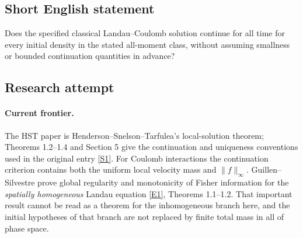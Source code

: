 \documentclass[11pt,a4paper]{article}
\newcommand{\sref}[2]{\hyperlink{source:#1:#2}{[S#2]}}
\newcommand{\eref}[2]{\hyperlink{extra:#1:#2}{[E#2]}}
\newif\ifshowcatalogue
\newcommand{\cataloguescope}[1]{\ifshowcatalogue
 \paragraph{Exact scope in the supplied catalogue.}
 \begin{quote}\small #1\end{quote}\fi}
\numberwithin{equation}{section}
\begin{document}
\cataloguescope{Fix a positive physical constant a. On [0,infinity) times R\textasciicircum{}3\_x times R\textasciicircum{}3\_v consider the classical Landau equation (partial\_t+v dot grad\_x)f=Q(f,f), where Q(f,f)=div\_v integral\_\{R\textasciicircum{}3\} A(v-w)[f(t,x,w) grad\_v f(t,x,v)-f(t,x,v) grad\_w f(t,x,w)]dw and A(z)=a |z|\textasciicircum{}(-1)(I-z tensor z/|z|\textasciicircum{}2) for z!=0. For every nonnegative initial datum f\_0 on R\textasciicircum{}6 with f\_0 in the global Holder space C\textasciicircum{}alpha for some 0<alpha<1, sup\_\{x,v\}<v>\textasciicircum{}k f\_0(x,v)<infinity for every k>=0, and constants delta,r\_0,R>0 such that for every x there exists |v\_x|<R with f\_0>=delta on the Euclidean R\textasciicircum{}6 ball B\_\{r\_0\}(x,v\_x), does the classical solution branch constructed in HST Theorems 1.2–1.4 have maximal continuation time T\_E=infinity? Here <v>=(1+|v|\textasciicircum{}2)\textasciicircum{}(1/2); the branch matches f\_0 as t decreases to zero, is smooth for positive time, and has all polynomial velocity weights bounded on every finite time slab of its existence. The exact question is global extension of that branch, with the sufficiently decaying uniformly continuous kinetic weak uniqueness convention in HST Section 5, not uniqueness among all generalized weak solutions. The HST Coulomb continuation quantity is Psi(T)=esssup\_\{0<=t<=T,x\} integral f(t,x,v)dv + esssup\_\{0<=t<=T,x,v\} f(t,x,v). Finite Psi on every finite time slab is the associated continuation criterion, not an extra hypothesis presumed true. No smallness near equilibrium, finite total spatial mass or uniform bound across different initial data is imposed.}
\subsection{Short English statement}
Does the specified classical Landau–Coulomb solution continue for all time for every initial density in the stated all-moment class, without assuming smallness or bounded continuation quantities in advance?
\subsection{Research attempt}

\paragraph{Current frontier.}
The HST paper is Henderson--Snelson--Tarfulea's local-solution theorem;
Theorems 1.2--1.4 and Section 5 give the continuation and uniqueness
conventions used in the original entry \sref{30006773}{1}. For Coulomb
interactions the continuation criterion contains both the uniform local
velocity mass and $\|f\|_\infty$. Guillen--Silvestre prove global regularity
and monotonicity of Fisher information for the \emph{spatially homogeneous}
Landau equation \eref{30006773}{1}, Theorems 1.1--1.2. That important result
cannot be read as a theorem for the inhomogeneous branch here, and the
initial hypotheses of that branch are not replaced by finite total mass
in all of phase space.
\end{document}
